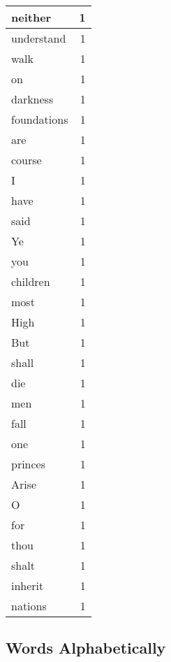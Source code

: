 \begin{center}
\begin{longtable}{l|r}
neither & 1 \\ \hline
understand & 1 \\ \hline
walk & 1 \\ \hline
on & 1 \\ \hline
darkness & 1 \\ \hline
foundations & 1 \\ \hline
are & 1 \\ \hline
course & 1 \\ \hline
I & 1 \\ \hline
have & 1 \\ \hline
said & 1 \\ \hline
Ye & 1 \\ \hline
you & 1 \\ \hline
children & 1 \\ \hline
most & 1 \\ \hline
High & 1 \\ \hline
But & 1 \\ \hline
shall & 1 \\ \hline
die & 1 \\ \hline
men & 1 \\ \hline
fall & 1 \\ \hline
one & 1 \\ \hline
princes & 1 \\ \hline
Arise & 1 \\ \hline
O & 1 \\ \hline
for & 1 \\ \hline
thou & 1 \\ \hline
shalt & 1 \\ \hline
inherit & 1 \\ \hline
nations & 1 \\ \hline
\end{longtable}
\end{center}



\normalsize



\subsection{Words Alphabetically}


